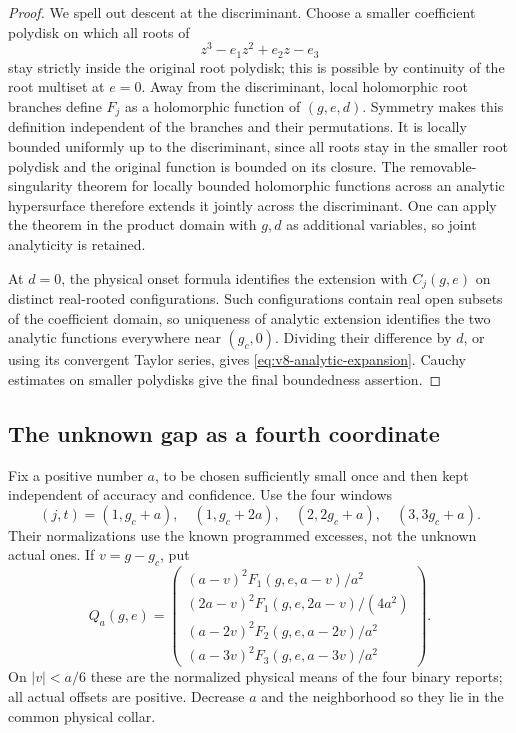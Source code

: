 \begin{proof}
We spell out descent at the discriminant. Choose a smaller coefficient
polydisk on which all roots of
\[
                     z^3-e_1z^2+e_2z-e_3
\]
stay strictly inside the original root polydisk; this is possible by
continuity of the root multiset at $e=0$. Away from the discriminant,
local holomorphic root branches define $F_j$ as a holomorphic function
of $(g,e,d)$. Symmetry makes this definition independent of the branches
and their permutations. It is locally bounded uniformly up to the
discriminant, since all roots stay in the smaller root polydisk and the
original function is bounded on its closure. The removable-singularity
theorem for locally bounded holomorphic functions across an analytic
hypersurface therefore extends it jointly across the discriminant.
One can apply the theorem in the product domain with $g,d$ as additional
variables, so joint analyticity is retained.

At $d=0$, the physical onset formula identifies the extension with
$C_j(g,e)$ on distinct real-rooted configurations. Such configurations
contain real open subsets of the coefficient domain, so uniqueness of
analytic extension identifies the two analytic functions everywhere
near $(g_c,0)$. Dividing their difference by $d$, or using its convergent
Taylor series, gives \eqref{eq:v8-analytic-expansion}. Cauchy estimates
on smaller polydisks give the final boundedness assertion.
\end{proof}

\subsection{The unknown gap as a fourth coordinate}
Fix a positive number $a$, to be chosen sufficiently small once and
then kept independent of accuracy and confidence. Use the four windows
\begin{equation}\label{eq:v8-windows}
 (j,t)=(1,g_c+a),\quad(1,g_c+2a),\quad
                         (2,2g_c+a),\quad(3,3g_c+a).
\end{equation}
Their normalizations use the known programmed excesses, not the unknown
actual ones. If $v=g-g_c$, put
\begin{equation}\label{eq:v8-Q}
 Q_a(g,e)=\begin{pmatrix}
 (a-v)^2F_1(g,e,a-v)/a^2\\
 (2a-v)^2F_1(g,e,2a-v)/(4a^2)\\
 (a-2v)^2F_2(g,e,a-2v)/a^2\\
 (a-3v)^2F_3(g,e,a-3v)/a^2
 \end{pmatrix}.
\end{equation}
On $|v|<a/6$ these are the normalized physical means of the four
binary reports; all actual offsets are positive. Decrease $a$ and the
neighborhood so they lie in the common physical collar.

